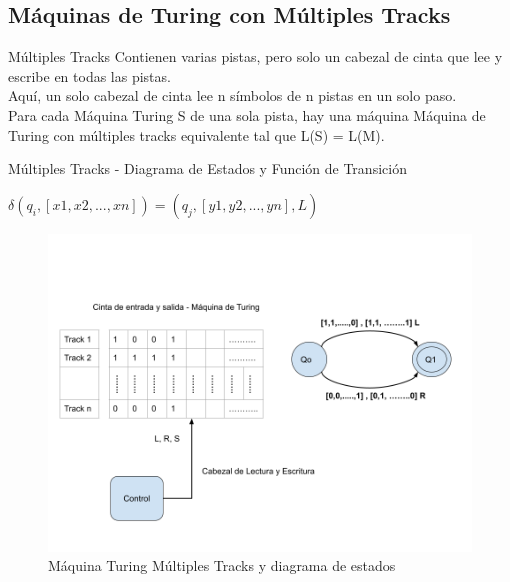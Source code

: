 \documentclass[11pt]{beamer}
\begin{document}
	\subsection{Máquinas de Turing con Múltiples Tracks}
	    \begin{frame}{Múltiples Tracks}
			\justifying
			Contienen varias pistas, pero solo un cabezal de cinta que lee y escribe en todas las pistas.\\
			Aquí, un solo cabezal de cinta lee n símbolos de n pistas en un solo paso. \\
			
			Para cada Máquina Turing S de una sola pista, hay una máquina Máquina de Turing con múltiples tracks equivalente tal que L(S) = L(M).
			
		\end{frame}
	    \begin{frame}{Múltiples Tracks - Diagrama de Estados y Función de Transición}
			\justifying
			
			$\delta(q_{i},[x1,x2, . . . , xn]) = (q_{j} , [y1, y2, . . . , yn],L)$ \\
			
			\begin{figure}[H]
				\centering
				\includegraphics[scale=0.28]{img/multitracks.png}
				\caption{Máquina Turing Múltiples Tracks y diagrama de estados}
				\label{fig: Multitracks}
			\end{figure}
		\end{frame}
\end{document}
